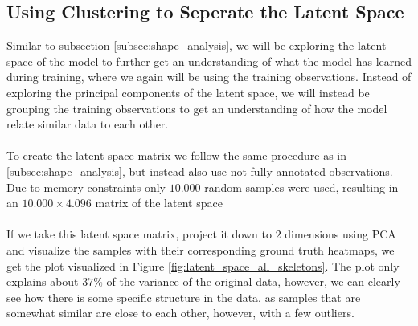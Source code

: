 \documentclass[./main.tex]{subfiles}
\begin{document}
\subsection{Using Clustering to Seperate the Latent Space}\label{subsec:clustering}
Similar to subsection \ref{subsec:shape_analysis}, we will be exploring the latent space of the model to further get an understanding of what the model has learned during training, where we again will be using the training observations. Instead of exploring the principal components of the latent space, we will instead be grouping the training observations to get an understanding of how the model relate similar data to each other.
\\
\\
To create the latent space matrix we follow the same procedure as in \ref{subsec:shape_analysis}, but instead also use not fully-annotated observations. Due to memory constraints only $10.000$ random samples were used, resulting in an $10.000 \times 4.096$ matrix of the latent space
\\
\\
If we take this latent space matrix, project it down to $2$ dimensions using PCA and visualize the samples with their corresponding ground truth heatmaps, we get the plot visualized in Figure \ref{fig:latent_space_all_skeletons}. The plot only explains about $37\%$ of the variance of the original data, however, we can clearly see how there is some specific structure in the data, as samples that are somewhat similar are close to each other, however, with a few outliers.
\\
\end{document}
